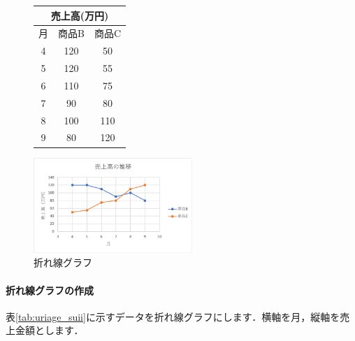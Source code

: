 \begin{figure}[htbp]
    \begin{minipage}{0.5\hsize}
        \centering
        \makeatletter
        \def\@captype{table}
        \makeatother
        \caption{}
        \begin{tabular}{|c|c|c|}
          \hline
          \multicolumn{3}{|c|}{売上高(万円)}\\ \hline
          月& 商品B & 商品C \\ \hline
          4 &  120 & 50\\ \hline
          5 &  120 & 55\\ \hline
          6 &  110 & 75\\ \hline
          7 &  90  & 80\\ \hline
          8 &  100 & 110\\ \hline
          9 &  80  & 120\\ \hline
        \end{tabular}
        \label{tab:uriage_suii}
    \end{minipage}
    \begin{minipage}{0.5\hsize}
        \centering
        \includegraphics[width=6cm]{chap2/line.png}
        \caption{折れ線グラフ}
        \label{fig:line}
    \end{minipage}
\end{figure}

\paragraph{折れ線グラフの作成}

表\ref{tab:uriage_suii}に示すデータを折れ線グラフにします．横軸を月，縦軸を売上金額とします．

